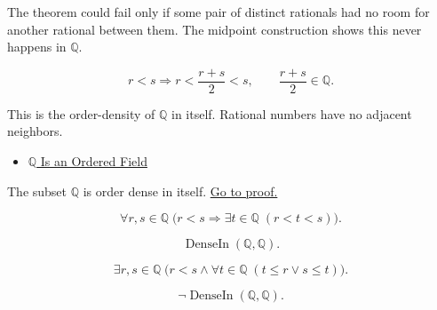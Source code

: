 \begin{remark*}
The theorem could fail only if some pair of distinct rationals had no room for
another rational between them. The midpoint construction shows this never
happens in $\mathbb{Q}$.
\end{remark*}

\begin{remark*}
\[
r<s
\Longrightarrow
r<\frac{r+s}{2}<s,
\qquad
\frac{r+s}{2}\in\mathbb{Q}.
\]
\end{remark*}

\begin{remark*}[Interpretation]
This is the order-density of $\mathbb{Q}$ in itself. Rational numbers have no
adjacent neighbors.
\end{remark*}

\begin{dependencies}
\begin{itemize}
  \item \hyperref[thm:q-is-ordered-field]{$\mathbb{Q}$ Is an Ordered Field}
\end{itemize}
\end{dependencies}

\begin{corollary}
\label{cor:q-dense-in-itself}
The subset $\mathbb{Q}$ is order dense in itself.
\hyperref[prf:q-dense-in-itself]{Go to proof.}
\end{corollary}

\begin{remark*}
\[
\forall r,s\in\mathbb{Q}\;
\bigl(r<s \Longrightarrow \exists t\in\mathbb{Q}\;(r<t<s)\bigr).
\]
\end{remark*}

\begin{remark*}
\[
\operatorname{DenseIn}(\mathbb{Q},\mathbb{Q}).
\]
\end{remark*}

\begin{remark*}
\[
\exists r,s\in\mathbb{Q}\;
\bigl(r<s \land \forall t\in\mathbb{Q}\;(t\le r \lor s\le t)\bigr).
\]
\end{remark*}

\begin{remark*}
\[
\neg\operatorname{DenseIn}(\mathbb{Q},\mathbb{Q}).
\]
\end{remark*}

